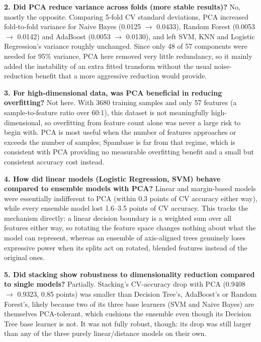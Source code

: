 \documentclass[12pt,a4paper]{article}
\begin{document}
\textbf{2. Did PCA reduce variance across folds (more stable results)?} No, mostly the
opposite. Comparing 5-fold CV standard deviations, PCA increased fold-to-fold variance for
Naive Bayes (0.0125 $\to$ 0.0433), Random Forest (0.0053 $\to$ 0.0142) and AdaBoost (0.0053
$\to$ 0.0130), and left SVM, KNN and Logistic Regression's variance roughly unchanged.
Since only 48 of 57 components were needed for 95\% variance, PCA here removed very little
redundancy, so it mainly added the instability of an extra fitted transform without the
usual noise-reduction benefit that a more aggressive reduction would provide.

\textbf{3. For high-dimensional data, was PCA beneficial in reducing overfitting?} Not
here. With 3680 training samples and only 57 features (a sample-to-feature ratio over 60:1),
this dataset is not meaningfully high-dimensional, so overfitting from feature count alone
was never a large risk to begin with. PCA is most useful when the number of features
approaches or exceeds the number of samples; Spambase is far from that regime, which is
consistent with PCA providing no measurable overfitting benefit and a small but consistent
accuracy cost instead.

\textbf{4. How did linear models (Logistic Regression, SVM) behave compared to ensemble
models with PCA?} Linear and margin-based models were essentially indifferent to PCA
(within 0.3 points of CV accuracy either way), while every ensemble model lost 1.6--3.5
points of CV accuracy. This tracks the mechanism directly: a linear decision boundary is a
weighted sum over all features either way, so rotating the feature space changes nothing
about what the model can represent, whereas an ensemble of axis-aligned trees genuinely loses
expressive power when its splits act on rotated, blended features instead of the original
ones.

\textbf{5. Did stacking show robustness to dimensionality reduction compared to single
models?} Partially. Stacking's CV-accuracy drop with PCA (0.9408 $\to$ 0.9323, 0.85 points)
was smaller than Decision Tree's, AdaBoost's or Random Forest's, likely because two of its
three base learners (SVM and Naive Bayes) are themselves PCA-tolerant, which cushions the
ensemble even though its Decision Tree base learner is not. It was not fully robust, though:
its drop was still larger than any of the three purely linear/distance models on their own.
\end{document}
